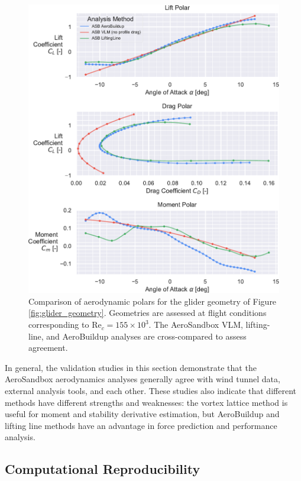 \begin{figure}[H]
    \centering
    \includegraphics[width=\textwidth]{../figures/aero_validation/glider_polars-crop.pdf}
    \caption{Comparison of aerodynamic polars for the glider geometry of Figure \ref{fig:glider_geometry}. Geometries are assessed at flight conditions corresponding to $\text{Re}_c = 155 \times 10^3$. The AeroSandbox VLM, lifting-line, and AeroBuildup analyses are cross-compared to assess agreement.}
    \label{fig:glider_results}
\end{figure}

In general, the validation studies in this section demonstrate that the AeroSandbox aerodynamics analyses generally agree with wind tunnel data, external analysis tools, and each other. These studies also indicate that different methods have different strengths and weaknesses: the vortex lattice method is useful for moment and stability derivative estimation, but AeroBuildup and lifting line methods have an advantage in force prediction and performance analysis.

\subsection{Computational Reproducibility}

